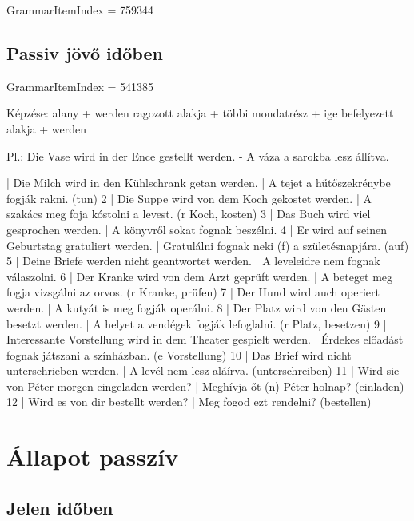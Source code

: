 \documentclass{article}
\newenvironment{desc}{\verbatim}{\endverbatim}
\newenvironment{exmp}{\verbatim}{\endverbatim}
\begin{document}
GrammarItemIndex = 759344

\begin{desc}
\end{desc}

\begin{exmp}
\end{exmp}

\subsection{Passiv jövő időben}

GrammarItemIndex = 541385

\begin{desc}
Képzése:
alany + werden ragozott alakja + többi mondatrész + ige befelyezett alakja + werden

Pl.: Die Vase wird in der Ence gestellt werden. - A váza a sarokba lesz állítva.
\end{desc}

\begin{exmp}
1 | Die Milch wird in den Kühlschrank getan werden. | A tejet a hűtőszekrénybe fogják rakni. (tun)
2 | Die Suppe wird von dem Koch gekostet werden. | A szakács meg foja kóstolni a levest. (r Koch, kosten)
3 | Das Buch wird viel gesprochen werden. | A könyvről sokat fognak beszélni.
4 | Er wird auf seinen Geburtstag gratuliert werden. | Gratulálni fognak neki (f) a születésnapjára. (auf)
5 | Deine Briefe werden nicht geantwortet werden. | A leveleidre nem fognak válaszolni.
6 | Der Kranke wird von dem Arzt geprüft werden. | A beteget meg fogja vizsgálni az orvos. (r Kranke, prüfen)
7 | Der Hund wird auch operiert werden. | A kutyát is meg fogják operálni.
8 | Der Platz wird von den Gästen besetzt werden. | A helyet a vendégek fogják lefoglalni. (r Platz, besetzen)
9 | Interessante Vorstellung wird in dem Theater gespielt werden. | Érdekes előadást fognak játszani a színházban. (e Vorstellung)
10 | Das Brief wird nicht unterschrieben werden. | A levél nem lesz aláírva. (unterschreiben)
11 | Wird sie von Péter morgen eingeladen werden? | Meghívja őt (n) Péter holnap? (einladen)
12 | Wird es von dir bestellt werden? | Meg fogod ezt rendelni? (bestellen)
\end{exmp}

\section{Állapot passzív}

\subsection{Jelen időben}
\end{document}
